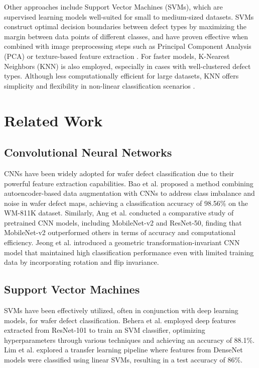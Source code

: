 \documentclass[conference]{IEEEtran}
\begin{document}
Other approaches include Support Vector Machines (SVMs), which are supervised learning models well-suited for small to medium-sized datasets. 
SVMs construct optimal decision boundaries between defect types by maximizing the margin between data points of different classes, and have proven effective when combined with image preprocessing steps such as Principal Component Analysis (PCA) or texture-based feature extraction \cite{bg5}. 
For faster models, K-Nearest Neighbors (KNN) is also employed, especially in cases with well-clustered defect types. 
Although less computationally efficient for large datasets, KNN offers simplicity and flexibility in non-linear classification scenarios \cite{bg6}. 

\section{Related Work} 
\subsection{Convolutional Neural Networks}
CNNs have been widely adopted for wafer defect classification due to their powerful feature extraction capabilities. 
Bao et al. \cite{rw1} proposed a method combining autoencoder-based data augmentation with CNNs to address class imbalance and noise in wafer defect maps, achieving a classification accuracy of 98.56\% on the WM-811K dataset. 
Similarly, Ang et al. \cite{rw2} conducted a comparative study of pretrained CNN models, including MobileNet-v2 and ResNet-50, finding that MobileNet-v2 outperformed others in terms of accuracy and computational efficiency. 
Jeong et al. \cite{rw3} introduced a geometric transformation-invariant CNN model that maintained high classification performance even with limited training data by incorporating rotation and flip invariance.

\subsection{Support Vector Machines}
SVMs have been effectively utilized, often in conjunction with deep learning models, for wafer defect classification. 
Behera et al. \cite{rw4} employed deep features extracted from ResNet-101 to train an SVM classifier, optimizing hyperparameters through various techniques and achieving an accuracy of 88.1\%. 
Lim et al. \cite{rw5} explored a transfer learning pipeline where features from DenseNet models were classified using linear SVMs, resulting in a test accuracy of 86\%.
\end{document}
